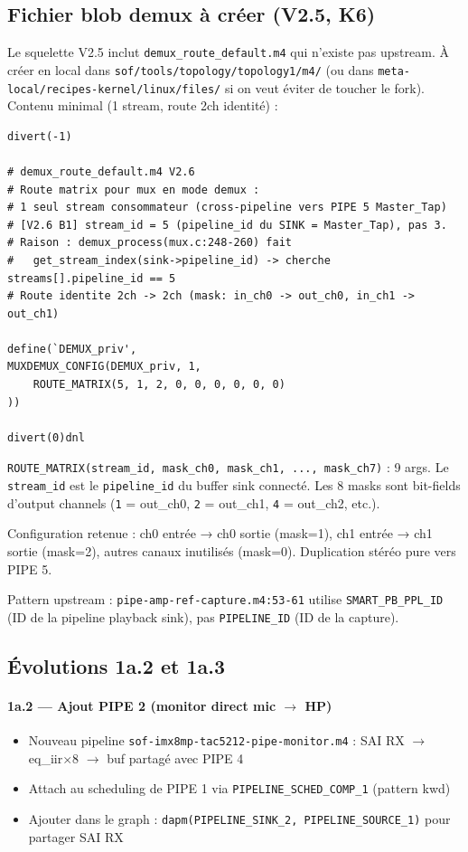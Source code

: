 \documentclass[11pt,a4paper]{article}
\begin{document}
\subsection{Fichier blob demux à créer (V2.5, K6)}

Le squelette V2.5 inclut \texttt{demux\_route\_default.m4} qui n'existe pas upstream. À créer en local dans \texttt{sof/tools/topology/topology1/m4/} (ou dans \texttt{meta-local/recipes-kernel/linux/files/} si on veut éviter de toucher le fork). Contenu minimal (1 stream, route 2ch identité) :

\begin{lstlisting}[language={}, basicstyle=\ttfamily\scriptsize]
divert(-1)

# demux_route_default.m4 V2.6
# Route matrix pour mux en mode demux :
# 1 seul stream consommateur (cross-pipeline vers PIPE 5 Master_Tap)
# [V2.6 B1] stream_id = 5 (pipeline_id du SINK = Master_Tap), pas 3.
# Raison : demux_process(mux.c:248-260) fait
#   get_stream_index(sink->pipeline_id) -> cherche streams[].pipeline_id == 5
# Route identite 2ch -> 2ch (mask: in_ch0 -> out_ch0, in_ch1 -> out_ch1)

define(`DEMUX_priv',
MUXDEMUX_CONFIG(DEMUX_priv, 1,
    ROUTE_MATRIX(5, 1, 2, 0, 0, 0, 0, 0, 0)
))

divert(0)dnl
\end{lstlisting}

\texttt{ROUTE\_MATRIX(stream\_id, mask\_ch0, mask\_ch1, ..., mask\_ch7)} : 9 args. Le \texttt{stream\_id} est le \texttt{pipeline\_id} du buffer sink connecté. Les 8 masks sont bit-fields d'output channels (\texttt{1} = out\_ch0, \texttt{2} = out\_ch1, \texttt{4} = out\_ch2, etc.).

Configuration retenue : ch0 entrée → ch0 sortie (mask=1), ch1 entrée → ch1 sortie (mask=2), autres canaux inutilisés (mask=0). Duplication stéréo pure vers PIPE 5.

Pattern upstream : \texttt{pipe-amp-ref-capture.m4:53-61} utilise \texttt{SMART\_PB\_PPL\_ID} (ID de la pipeline playback sink), pas \texttt{PIPELINE\_ID} (ID de la capture).

\subsection{Évolutions 1a.2 et 1a.3}

\paragraph{1a.2 --- Ajout PIPE 2 (monitor direct mic $\rightarrow$ HP)}
\begin{itemize}[leftmargin=*, itemsep=1pt]
  \item Nouveau pipeline \texttt{sof-imx8mp-tac5212-pipe-monitor.m4} : SAI RX $\rightarrow$ eq\_iir$\times$8 $\rightarrow$ buf partagé avec PIPE 4
  \item Attach au scheduling de PIPE 1 via \texttt{PIPELINE\_SCHED\_COMP\_1} (pattern kwd)
  \item Ajouter dans le graph : \texttt{dapm(PIPELINE\_SINK\_2, PIPELINE\_SOURCE\_1)} pour partager SAI RX
\end{itemize}
\end{document}
